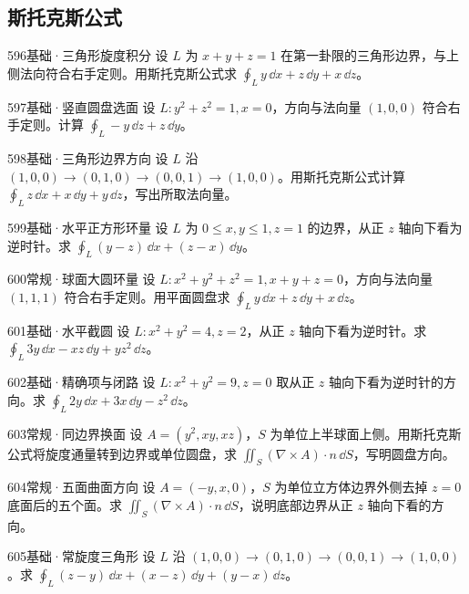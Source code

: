 \subsection{斯托克斯公式}
\begin{exercise}{596}{基础·三角形旋度积分}
设 $L$ 为 $x+y+z=1$ 在第一卦限的三角形边界，与上侧法向符合右手定则。用斯托克斯公式求 $\oint_Ly\,\dd x+z\,\dd y+x\,\dd z$。
\end{exercise}
\begin{exercise}{597}{基础·竖直圆盘选面}
设 $L:y^2+z^2=1,x=0$，方向与法向量 $(1,0,0)$ 符合右手定则。计算 $\oint_L-y\,\dd z+z\,\dd y$。
\end{exercise}
\begin{exercise}{598}{基础·三角形边界方向}
设 $L$ 沿 $(1,0,0)\to(0,1,0)\to(0,0,1)\to(1,0,0)$。用斯托克斯公式计算 $\oint_Lz\,\dd x+x\,\dd y+y\,\dd z$，写出所取法向量。
\end{exercise}
\begin{exercise}{599}{基础·水平正方形环量}
设 $L$ 为 $0\leq x,y\leq1,z=1$ 的边界，从正 $z$ 轴向下看为逆时针。求 $\oint_L(y-z)\,\dd x+(z-x)\,\dd y$。
\end{exercise}
\begin{exercise}{600}{常规·球面大圆环量}
设 $L:x^2+y^2+z^2=1,x+y+z=0$，方向与法向量 $(1,1,1)$ 符合右手定则。用平面圆盘求 $\oint_Ly\,\dd x+z\,\dd y+x\,\dd z$。
\end{exercise}
\begin{exercise}{601}{基础·水平截圆}
设 $L:x^2+y^2=4,z=2$，从正 $z$ 轴向下看为逆时针。求 $\oint_L3y\,\dd x-xz\,\dd y+yz^2\,\dd z$。
\end{exercise}
\begin{exercise}{602}{基础·精确项与闭路}
设 $L:x^2+y^2=9,z=0$ 取从正 $z$ 轴向下看为逆时针的方向。求 $\oint_L2y\,\dd x+3x\,\dd y-z^2\,\dd z$。
\end{exercise}
\begin{exercise}{603}{常规·同边界换面}
设 $A=(y^2,xy,xz)$，$S$ 为单位上半球面上侧。用斯托克斯公式将旋度通量转到边界或单位圆盘，求 $\iint_S(\nabla\times A)\cdot n\,\dd S$，写明圆盘方向。
\end{exercise}
\begin{exercise}{604}{常规·五面曲面方向}
设 $A=(-y,x,0)$，$S$ 为单位立方体边界外侧去掉 $z=0$ 底面后的五个面。求 $\iint_S(\nabla\times A)\cdot n\,\dd S$，说明底部边界从正 $z$ 轴向下看的方向。
\end{exercise}
\begin{exercise}{605}{基础·常旋度三角形}
设 $L$ 沿 $(1,0,0)\to(0,1,0)\to(0,0,1)\to(1,0,0)$。求 $\oint_L(z-y)\,\dd x+(x-z)\,\dd y+(y-x)\,\dd z$。
\end{exercise}
